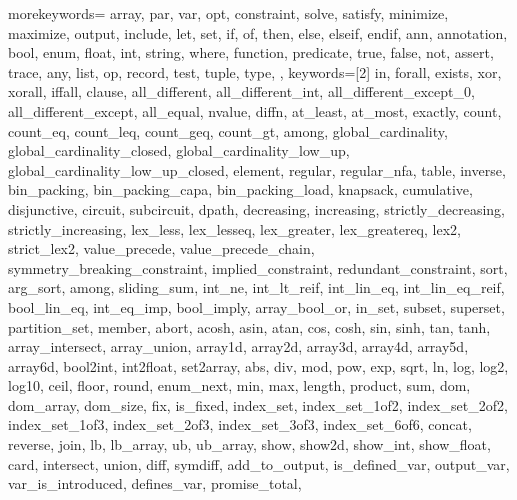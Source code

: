 
\usepackage{listings}
\usepackage{courier} %

\newcommand\mznfont{\fontfamily{pcr}\selectfont}

{
  morekeywords={
  array, par, var, opt, constraint, solve, satisfy, minimize,
  maximize, output, include, let, set, if, of, then, else, elseif, endif,
  ann, annotation, bool, enum, float, int, string, where, function,
  predicate, true, false, not, assert, trace,
  any, list, op, record, test, tuple, type,
  },
  keywords=[2]{
  in, forall, exists, xor, xorall, iffall, clause,
  all_different, all_different_int,
  all_different_except_0, all_different_except, all_equal,
  nvalue, diffn,
  at_least, at_most, exactly, %
  count, count_eq, count_leq, count_geq, count_gt, among,
  global_cardinality, global_cardinality_closed,
  global_cardinality_low_up, global_cardinality_low_up_closed,
  element, regular, regular_nfa, table, inverse,
  bin_packing, bin_packing_capa, bin_packing_load, knapsack,
  cumulative, disjunctive, circuit, subcircuit, dpath,
  decreasing, increasing,
  strictly_decreasing, strictly_increasing,
  lex_less, lex_lesseq, lex_greater, lex_greatereq, lex2, strict_lex2,
  value_precede, value_precede_chain,
  symmetry_breaking_constraint, implied_constraint, redundant_constraint,
  sort, arg_sort, among, sliding_sum,
  int_ne, int_lt_reif, int_lin_eq, int_lin_eq_reif, bool_lin_eq, int_eq_imp,
  bool_imply, array_bool_or,
  in_set, subset, superset, partition_set, member,
  abort,
  acosh, asin, atan, cos, cosh, sin, sinh, tan, tanh,
  array_intersect, array_union,
  array1d, array2d, array3d, array4d, array5d, array6d,
  bool2int, int2float, set2array,
  abs, div, mod, pow, exp, sqrt, ln, log, log2, log10,
  ceil, floor, round,
  enum_next,
  min, max, length, product, sum,
  dom, dom_array, dom_size, fix, is_fixed,
  index_set, index_set_1of2, index_set_2of2,
  index_set_1of3, index_set_2of3, index_set_3of3, index_set_6of6,
  concat, reverse, join,
  lb, lb_array, ub, ub_array,
  show, show2d, show_int, show_float,
  card, intersect, union, diff, symdiff,
  add_to_output,
  is_defined_var, output_var, var_is_introduced, defines_var, promise_total,
}}
